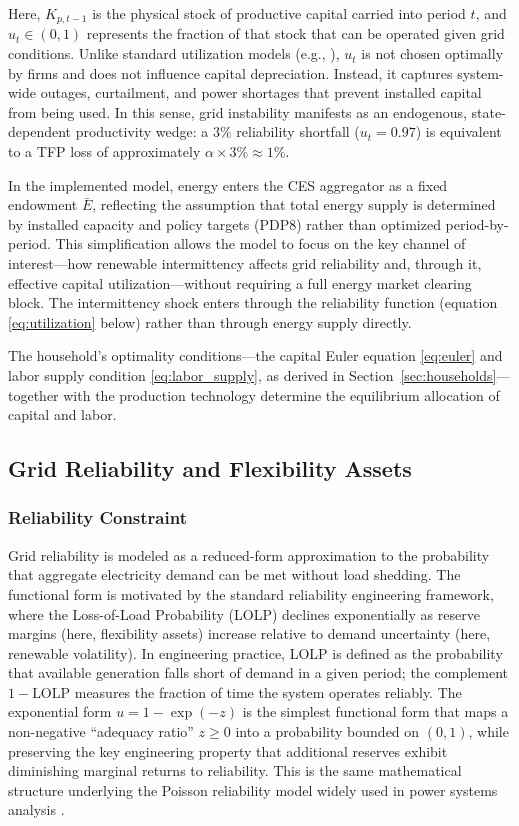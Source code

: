 \documentclass[12pt, a4paper]{article}
\begin{document}
Here, $K_{p,t-1}$ is the physical stock of productive capital carried into period $t$, and $u_t \in (0,1)$ represents the fraction of that stock that can be operated given grid conditions. Unlike standard utilization models (e.g., \citet{greenwood1988}), $u_t$ is not chosen optimally by firms and does not influence capital depreciation. Instead, it captures system-wide outages, curtailment, and power shortages that prevent installed capital from being used. In this sense, grid instability manifests as an endogenous, state-dependent productivity wedge: a 3\% reliability shortfall ($u_t = 0.97$) is equivalent to a TFP loss of approximately $\alpha \times 3\% \approx 1\%$.

In the implemented model, energy enters the CES aggregator as a fixed endowment $\bar{E}$, reflecting the assumption that total energy supply is determined by installed capacity and policy targets (PDP8) rather than optimized period-by-period. This simplification allows the model to focus on the key channel of interest---how renewable intermittency affects grid reliability and, through it, effective capital utilization---without requiring a full energy market clearing block. The intermittency shock enters through the reliability function (equation \eqref{eq:utilization} below) rather than through energy supply directly.

The household's optimality conditions---the capital Euler equation \eqref{eq:euler} and labor supply condition \eqref{eq:labor_supply}, as derived in Section~\ref{sec:households}---together with the production technology determine the equilibrium allocation of capital and labor.

\subsection{Grid Reliability and Flexibility Assets}

\subsubsection{Reliability Constraint}

Grid reliability is modeled as a reduced-form approximation to the probability that aggregate electricity demand can be met without load shedding. The functional form is motivated by the standard reliability engineering framework, where the Loss-of-Load Probability (LOLP) declines exponentially as reserve margins (here, flexibility assets) increase relative to demand uncertainty (here, renewable volatility). In engineering practice, LOLP is defined as the probability that available generation falls short of demand in a given period; the complement $1 - \text{LOLP}$ measures the fraction of time the system operates reliably. The exponential form $u = 1 - \exp(-z)$ is the simplest functional form that maps a non-negative ``adequacy ratio'' $z \geq 0$ into a probability bounded on $(0,1)$, while preserving the key engineering property that additional reserves exhibit diminishing marginal returns to reliability. This is the same mathematical structure underlying the Poisson reliability model widely used in power systems analysis \citep{zakeri2015, lund2015}.
\end{document}

